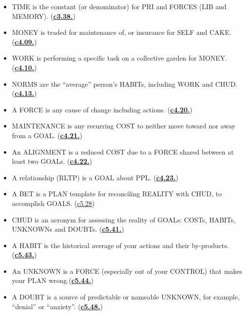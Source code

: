 \documentclass[
]{book}
\begin{document}
\begin{itemize}
\item
  TIME is the constant (or denominator) for PRI and FORCES (LIB and MEMORY). (\protect\hyperlink{attention-and-time}{\textbf{c3.38.}})\\
\item
  MONEY is traded for maintenance of, or insurance for SELF and CAKE. (\protect\hyperlink{ppl}{\textbf{c4.09.}})\\
\item
  WORK is performing a specific task on a collective garden for MONEY. (\protect\hyperlink{work}{\textbf{c4.10.}})\\
\item
  NORMS are the ``average'' person's HABITs, including WORK and CHUD. (\protect\hyperlink{work}{\textbf{c4.13.}})\\
\item
  A FORCE is any cause of change including actions. (\protect\hyperlink{work}{\textbf{c4.20.}})\\
\item
  MAINTENANCE is any recurring COST to neither move toward nor away from a GOAL. (\protect\hyperlink{work}{\textbf{c4.21.}})\\
\item
  An ALIGNMENT is a reduced COST due to a FORCE shared between at least two GOALs. (\protect\hyperlink{work}{\textbf{c4.22.}})\\
\item
  A relationship (RLTP) is a GOAL about PPL. (\protect\hyperlink{work}{\textbf{c4.23.}})\\
\item
  A BET is a PLAN template for reconciling REALITY with CHUD, to accomplish GOALS. (\protect\hyperlink{bet}{c5.28})\\
\item
  CHUD is an acronym for assessing the reality of GOALs: COSTs, HABITs, UNKNOWNs and DOUBTs. (\protect\hyperlink{c.h.u.d.}{\textbf{c5.41.}})\\
\item
  A HABIT is the historical average of your actions and their by-products.(\protect\hyperlink{costs-and-habits}{\textbf{c5.43.}})\\
\item
  An UNKNOWN is a FORCE (especially out of your CONTROL) that makes your PLAN wrong.(\protect\hyperlink{unknowns-and-doubts}{\textbf{c5.44.}})\\
\item
  A DOUBT is a source of predictable or nameable UNKNOWN, for example, ``denial'' or ``anxiety''. (\protect\hyperlink{unknowns-and-doubts}{\textbf{c5.48.}})\\

\end{itemize}
\end{document}
